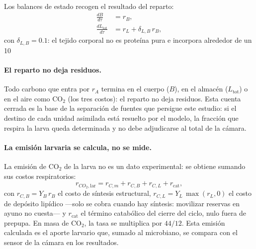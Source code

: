 Los balances de estado recogen el resultado del reparto:
\begin{align}
  \frac{dB}{d\tau} &= r_B, \label{eq:balanceB} \\
  \frac{dL_{\mathrm{tot}}}{d\tau} &= r_L + \delta_{L,B}\,r_B,
  \label{eq:balanceL}
\end{align}
con $\delta_{L,B} = 0.1$: el tejido corporal no es proteína pura e incorpora alrededor de un 10%

\paragraph{El reparto no deja residuos.}
Todo carbono que entra por $r_A$ termina en el cuerpo ($B$), en el almacén ($L_{\mathrm{tot}}$) o en el aire como CO$_2$ (los tres costos): el reparto no deja residuos. Esta cuenta cerrada es la base de la separación de fuentes que persigue este estudio: si el destino de cada unidad asimilada está resuelto por el modelo, la fracción que respira la larva queda determinada y no debe adjudicarse al total de la cámara.

\paragraph{La emisión larvaria se calcula, no se mide.}
La emisión de CO$_2$ de la larva no es un dato experimental: se obtiene sumando sus costos respiratorios:
\begin{equation}
  r_{CO_2,\mathrm{lar}} = r_{C,m} + r_{C,B} + r_{C,L} + r_{\mathrm{cat}},
  \label{eq:emision}
\end{equation}
con $r_{C,B} = Y_B\,r_B$ el costo de síntesis estructural, $r_{C,L} = Y_L\,\max(r_L, 0)$ el costo de depósito lipídico ---solo se cobra cuando hay síntesis: movilizar reservas en ayuno no cuesta--- y $r_{\mathrm{cat}}$ el término catabólico del cierre del ciclo, nulo fuera de prepupa. En masa de CO$_2$, la tasa se multiplica por $44/12$. Esta emisión calculada es el aporte larvario que, sumado al microbiano, se compara con el sensor de la cámara en los resultados.


